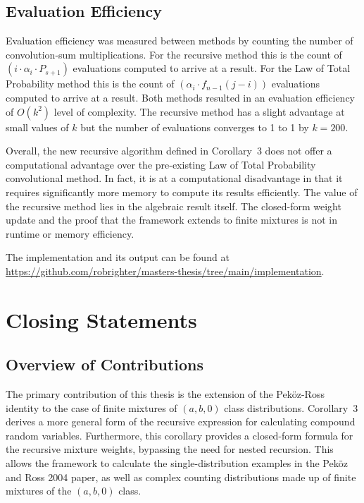 \documentclass[11pt]{amsart}
\theoremstyle{definition}
\theoremstyle{plain}
\begin{document}
\subsection{Evaluation Efficiency}

Evaluation efficiency was measured between methods by counting the number of
convolution-sum multiplications. For the recursive method this is the count of
$(i \cdot \alpha_i \cdot P_{s+1})$ evaluations computed to arrive at a result. For the Law
of Total Probability method this is the count of $(\alpha_i \cdot f_{n-1}(j - i))$
evaluations computed to arrive at a result. Both methods resulted in an evaluation
efficiency of $O(k^2)$ level of complexity. The recursive method has a slight advantage at
small values of $k$ but the number of evaluations converges to 1 to 1 by $k = 200$.

Overall, the new recursive algorithm defined in Corollary~3 does not offer a computational
advantage over the pre-existing Law of Total Probability convolutional method. In fact, it
is at a computational disadvantage in that it requires significantly more memory to compute
its results efficiently. The value of the recursive method lies in the algebraic result
itself. The closed-form weight update and the proof that the framework extends to finite
mixtures is not in runtime or memory efficiency.

The implementation and its output can be found at
\url{https://github.com/robrighter/masters-thesis/tree/main/implementation}.

\newpage
\section{Closing Statements}

\subsection{Overview of Contributions}

The primary contribution of this thesis is the extension of the Pek\"{o}z-Ross identity to the
case of finite mixtures of $(a, b, 0)$ class distributions. Corollary~3 derives a more general
form of the recursive expression for calculating compound random variables. Furthermore,
this corollary provides a closed-form formula for the recursive mixture weights, bypassing
the need for nested recursion. This allows the framework to calculate the single-distribution
examples in the Pek\"{o}z and Ross 2004 paper, as well as complex counting distributions
made up of finite mixtures of the $(a, b, 0)$ class.
\end{document}
